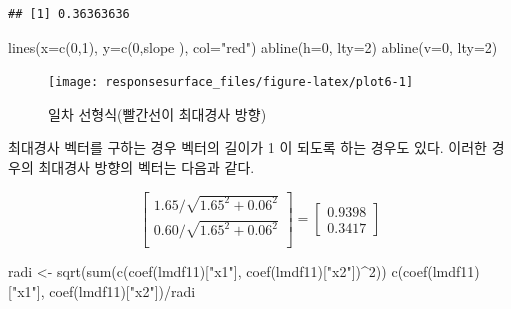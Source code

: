 \documentclass[
]{book}
\newenvironment{Shaded}{\begin{snugshade}}{\end{snugshade}}
\newcommand{\AttributeTok}[1]{\textcolor[rgb]{0.77,0.63,0.00}{#1}}
\newcommand{\DecValTok}[1]{\textcolor[rgb]{0.00,0.00,0.81}{#1}}
\newcommand{\FunctionTok}[1]{\textcolor[rgb]{0.00,0.00,0.00}{#1}}
\newcommand{\NormalTok}[1]{#1}
\newcommand{\OtherTok}[1]{\textcolor[rgb]{0.56,0.35,0.01}{#1}}
\newcommand{\SpecialCharTok}[1]{\textcolor[rgb]{0.00,0.00,0.00}{#1}}
\newcommand{\StringTok}[1]{\textcolor[rgb]{0.31,0.60,0.02}{#1}}
\theoremstyle{definition}
\theoremstyle{definition}
\theoremstyle{definition}
\theoremstyle{definition}
\theoremstyle{remark}
\begin{document}
\begin{verbatim}
## [1] 0.36363636
\end{verbatim}

\begin{Shaded}
\begin{Highlighting}[]
\FunctionTok{lines}\NormalTok{(}\AttributeTok{x=}\FunctionTok{c}\NormalTok{(}\DecValTok{0}\NormalTok{,}\DecValTok{1}\NormalTok{), }\AttributeTok{y=}\FunctionTok{c}\NormalTok{(}\DecValTok{0}\NormalTok{,slope ), }\AttributeTok{col=}\StringTok{"red"}\NormalTok{)}
\FunctionTok{abline}\NormalTok{(}\AttributeTok{h=}\DecValTok{0}\NormalTok{, }\AttributeTok{lty=}\DecValTok{2}\NormalTok{)}
\FunctionTok{abline}\NormalTok{(}\AttributeTok{v=}\DecValTok{0}\NormalTok{, }\AttributeTok{lty=}\DecValTok{2}\NormalTok{)}
\end{Highlighting}
\end{Shaded}

\begin{figure}

{\centering \texttt{[image: responsesurface\_files/figure-latex/plot6-1]} 

}

\caption{일차 선형식(빨간선이 최대경사 방향)}\label{fig:plot6}
\end{figure}

최대경사 벡터를 구하는 경우 벡터의 길이가 1 이 되도록 하는 경우도 있다. 이러한 경우의 최대경사 방향의 벡터는 다음과 같다.

\begin{equation}
\begin{bmatrix} 
1.65 / \sqrt{1.65^2 + 0.06^2}  \\
0.60 / \sqrt{1.65^2 + 0.06^2}  \\
\end{bmatrix} 
=
\begin{bmatrix} 
0.9398 \\
0.3417
\end{bmatrix} 
\label{eq:steepacenddata2}
\end{equation}

\begin{Shaded}
\begin{Highlighting}[]
\NormalTok{radi }\OtherTok{\textless{}{-}} \FunctionTok{sqrt}\NormalTok{(}\FunctionTok{sum}\NormalTok{(}\FunctionTok{c}\NormalTok{(}\FunctionTok{coef}\NormalTok{(lmdf11)[}\StringTok{"x1"}\NormalTok{], }\FunctionTok{coef}\NormalTok{(lmdf11)[}\StringTok{"x2"}\NormalTok{])}\SpecialCharTok{\^{}}\DecValTok{2}\NormalTok{))}
\FunctionTok{c}\NormalTok{(}\FunctionTok{coef}\NormalTok{(lmdf11)[}\StringTok{"x1"}\NormalTok{], }\FunctionTok{coef}\NormalTok{(lmdf11)[}\StringTok{"x2"}\NormalTok{])}\SpecialCharTok{/}\NormalTok{radi}
\end{Highlighting}
\end{Shaded}
\end{document}
